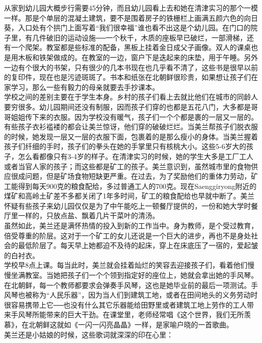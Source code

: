 从家到幼儿园大概步行需要45分钟，而且幼儿园看上去和她在清津实习的那个一模一样。那是个单层的混凝土建筑，要不是围着房子的铁栅栏上画满五颜六色的向日葵，入口处有个拱门上面写着“我们很幸福”谁也看不出这是个幼儿园。在门口的院子里，有几件破旧的运动设施──一个秋千，木质的座板早已破烂，一部滑梯，还有一个爬架。教室都是些标准的配备，黑板上挂着金日成父子画像。双人的课桌也是用木板和铁架做成的。在教室的一边，窗户下是迭起来的床垫，用于午睡。另外一边有个很大的书架，只有很少的几本书现在也几乎看不清了，这些书是很早以前的复印件，现在也是污迹斑斑了。书本和纸张在北朝鲜很珍贵，如果想让孩子们在家学习，那么一些有毅力的母亲就要去手抄课本。\\

学校之间的差别主要在于学生本身。乡村的孩子们看上去就比他们在城市的同龄人要穷很多。幼儿园期间还没有制服，因而孩子们穿的也都是五花八门，大多都是哥哥姐姐传下来的衣服。因为学校没有暖气，孩子们一个个都是裹的一层又一层的。有些孩子衣衫褴褛的都会让美兰惊讶，他们穿的破破烂烂。当美兰帮孩子们脱衣服的时候，她发现一层又一层的衣服下面，包裹着的是那么瘦小的身体。当美兰握着孩子们纤细的手时，孩子们的拳头在她的手掌里只有核桃大小。这些5-6岁大的孩子，怎么看都像只有3-4岁的样子。在清津实习的时候，她的学生大多是工厂工人或者当官人家的孩子；而这些都是矿工的孩子。美兰意识到，虽然城市里的食物供应很成问题，但是矿场食物短缺更严重。在过去，为了奖励他们的重体力劳动，矿工能得到每天900克的粮食配给，多过普通工人的700克。现在Saenggiryong附近的煤矿和高岭土矿差不多都关闭了1年多时间，矿工的粮食配给也早就中断了。美兰怀疑有些孩子来幼儿园仅仅是为了中午能吃上一顿餐厅提供的，一份和她大学时餐厅里一样的，只放点盐、飘着几片干菜叶的清汤。\\

虽然如此，美兰还是满怀热情的投入到新的工作当中。身为教师，是个受过教育，倍受尊重的阶层。这对于一个矿工的女儿还说是一个巨大的进步，再也不是身处社会的最低阶层了。每天早上她都迫不及待的起床，穿上在床底压了一宿的，爱起皱的白衬衣。\\

学校早8点上课。每当此时，美兰就会挂着灿烂的笑容去迎接孩子们，看着他们慢慢坐满教室。当她把孩子们一个个领到指定好的座位上，她就会拿出她的手风琴。在北朝鲜，每一个教师都要求会弹奏手风琴，这也是她毕业前的最后一项测试。手风琴也被称为“人民乐器”，因为当人们到建筑工地，或者在田间地头的义务劳动时很容易携带上它──也没有什么其它乐器能给田野里或者建筑工地上劳作的工人带来手风琴所能带来的巨大干劲。在课堂里，老师经常唱《这个世界，我们无所羡慕》，在北朝鲜这就如《一闪一闪亮晶晶》一样，是家喻户晓的一首歌曲。\\

美兰还是小姑娘的时候，这些歌词就深深的印在心里：\\

